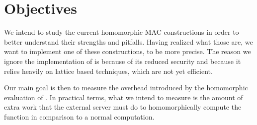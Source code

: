 \begin{comment}
As for the homomorphic MAC schemes, they all rely on the theory of arithmetic
circuits for the computation of functions over some messages. Simply put, an
arithmetic circuit over a field $\bbF$ and a set of variables $X
= \{\tauSpace{1}{k}\}$, is a directed acyclic graph with the following
properties.  Each node in the graph is called \emph{gate}. Gates with in-degree
0 are called \emph{input} gates while gates with out-degree 0 are called
\emph{output} gates. Each input gate is labeled by either a \emph{variable} or
a \emph{constant}. A variable input gate is labeled with a binary string
$\tau_i$ and can take arbitrary values in $\bbF$. A constant input gate is
labeled with some constant $c$ and can only take some fixed value $c \in \bbF$.
Each \emph{internal} gate (gates with in/out-degree greater than 0) is labeled
by either $+$ or $\times$, sum and product gates, respectively. The \emph{size}
of the circuit is the number of its gates. The \emph{depth} is the length of
the longest path from input to output.

Polynomials are evaluated with arithmetic circuits as follows: input gates
compute the polynomial defined by their labels. Sum gates compute the
polynomial obtained by the sum of the (two) polynomials on their incoming
wires, while product gates compute the product of the two polynomials on their
incoming wires. The output of the circuit is the value contained on the
outgoing wire of the output gate.
\end{comment}

\section{Objectives}
We intend to study the current homomorphic MAC constructions in order to better
understand their strengths and pitfalls. Having realized what those are, we
want to implement one of these constructions, \textcite{catalano:fiore:2013} to
be more precise. The reason we ignore the implementation of
\textcite{gennaro:wichs:2012} is because of its reduced security and because it
relies heavily on lattice based techniques, which are not yet efficient.

Our main goal is then to measure the overhead introduced by the homomorphic
evaluation of \cite{catalano:fiore:2013}. In practical terms, what we intend to
measure is the amount of extra work that the external server must do to
homomorphically compute the function in comparison to a normal computation.

